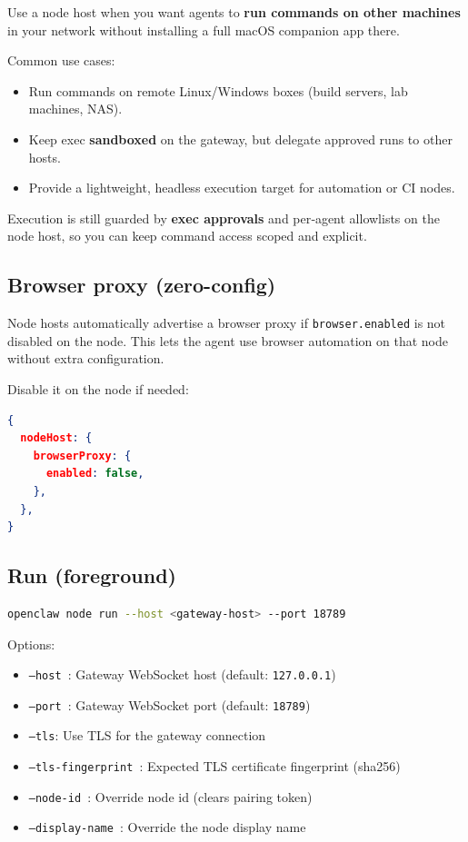 Use a node host when you want agents to \textbf{run commands on other machines} in your
network without installing a full macOS companion app there.

Common use cases:

\begin{itemize}
  \item Run commands on remote Linux/Windows boxes (build servers, lab machines, NAS).
  \item Keep exec \textbf{sandboxed} on the gateway, but delegate approved runs to other hosts.
  \item Provide a lightweight, headless execution target for automation or CI nodes.
\end{itemize}


Execution is still guarded by \textbf{exec approvals} and per‑agent allowlists on the
node host, so you can keep command access scoped and explicit.

\subsection{Browser proxy (zero-config)}


Node hosts automatically advertise a browser proxy if \texttt{browser.enabled} is not
disabled on the node. This lets the agent use browser automation on that node
without extra configuration.

Disable it on the node if needed:

\begin{lstlisting}[language=json]
{
  nodeHost: {
    browserProxy: {
      enabled: false,
    },
  },
}
\end{lstlisting}


\subsection{Run (foreground)}


\begin{lstlisting}[language=bash]
openclaw node run --host <gateway-host> --port 18789
\end{lstlisting}


Options:

\begin{itemize}
  \item \texttt{--host }: Gateway WebSocket host (default: \texttt{127.0.0.1})
  \item \texttt{--port }: Gateway WebSocket port (default: \texttt{18789})
  \item \texttt{--tls}: Use TLS for the gateway connection
  \item \texttt{--tls-fingerprint }: Expected TLS certificate fingerprint (sha256)
  \item \texttt{--node-id }: Override node id (clears pairing token)
  \item \texttt{--display-name }: Override the node display name
\end{itemize}


